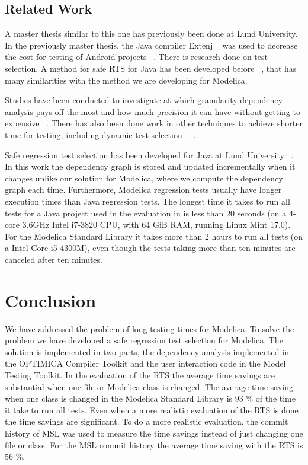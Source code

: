 \documentclass{cslthse-msc}
\begin{document}
\section{Related Work}
A master thesis similar to this one has previously been done at Lund University. In the previously master thesis, the Java compiler Extenj ~\cite{DBLP:conf/oopsla/EkmanH07} was used to decrease the cost for testing of Android projects ~\cite{kampe2012dependroid}. There is research done on test selection. A method for safe RTS for Java has been developed before ~\cite{DBLP:conf/pppj/OqvistHM16}, that has many similarities with the method we are developing for Modelica. 

Studies have been conducted to investigate at which granularity dependency analysis pays off the most and how much precision it can have without getting to expensive ~\cite{DBLP:conf/sigsoft/LegunsenHSLZM16}. There has also been done work in other techniques to achieve shorter time for testing, including dynamic test selection ~\cite{DBLP:journals/tse/RothermelH96}~\cite{DBLP:conf/issta/GligoricEM15}.

Safe regression test selection has been developed for Java at Lund University ~\cite{DBLP:conf/pppj/OqvistHM16}. In this work the dependency graph is stored and updated incrementally when it changes unlike our solution for Modelica, where we compute the dependency graph each time. Furthermore, Modelica regression tests usually have longer execution times than Java regression tests. The longest time it takes to run all tests for a Java project used in the evaluation in \cite{DBLP:conf/pppj/OqvistHM16} is less than 20 seconds (on a 4-core 3.6GHz Intel i7-3820 CPU, with 64 GiB RAM, running Linux Mint 17.0). For the Modelica Standard Library it takes more than 2 hours to run all tests (on a Intel Core i5-4300M), even though the tests taking more than ten minutes are canceled after ten minutes.

\chapter[Conclusion]{Conclusion}
We have addressed the problem of long testing times for Modelica. To solve the problem we have developed a safe regression test selection for Modelica. The solution is implemented in two parts, the dependency analysis implemented in the OPTIMICA Compiler Toolkit and the user interaction code in the Model Testing Toolkit. In the evaluation of the RTS the average time savings are substantial when one file or Modelica class is changed. The average time saving when one class is changed in the Modelica Standard Library is 93 \% of the time it take to run all tests. Even when a more realistic evaluation of the RTS is done the time savings are significant. To do a more realistic evaluation, the commit history of MSL was used to measure the time savings instead of just changing one file or class. For the MSL commit history the average time saving with the RTS is 56 \%.
\end{document}
